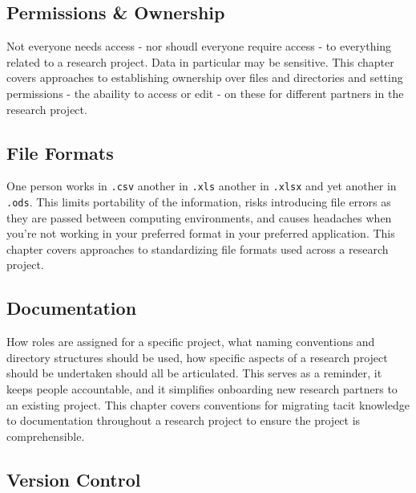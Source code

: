 \documentclass[
]{book}
\begin{document}
\hypertarget{permissions-ownership}{%
\subsection*{Permissions \& Ownership}\label{permissions-ownership}}

Not everyone needs access - nor shoudl everyone require access - to everything related to a research project. Data in particular may be sensitive. This chapter covers approaches to establishing ownership over files and directories and setting permissions - the abaility to access or edit - on these for different partners in the research project.

\hypertarget{file-formats}{%
\subsection*{File Formats}\label{file-formats}}

One person works in \texttt{.csv} another in \texttt{.xls} another in \texttt{.xlsx} and yet another in \texttt{.ods}. This limits portability of the information, risks introducing file errors as they are passed between computing environments, and causes headaches when you're not working in your preferred format in your preferred application. This chapter covers approaches to standardizing file formats used across a research project.

\hypertarget{documentation}{%
\subsection*{Documentation}\label{documentation}}

How roles are assigned for a specific project, what naming conventions and directory structures should be used, how specific aspects of a research project should be undertaken should all be articulated. This serves as a reminder, it keeps people accountable, and it simplifies onboarding new research partners to an existing project. This chapter covers conventions for migrating tacit knowledge to documentation throughout a research project to ensure the project is comprehensible.

\hypertarget{version-control}{%
\subsection*{Version Control}\label{version-control}}
\end{document}
